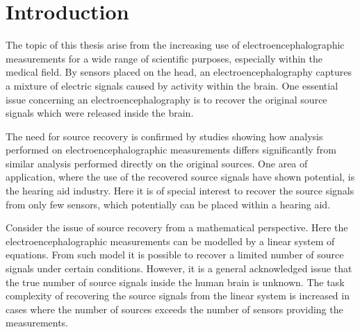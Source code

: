 \chapter*{Introduction}\label{ch:introduction}
%
%
The topic of this thesis arise from the increasing use of electroencephalographic measurements for a wide range of scientific purposes, especially within the medical field. 
By sensors placed on the head, an electroencephalography captures a mixture of electric signals caused by activity within the brain.   
One essential issue concerning an electroencephalography is to  
recover the original source signals which were released inside the brain. 
 
The need for source recovery is confirmed by studies showing how analysis performed on electroencephalographic measurements differs significantly from similar analysis performed directly on the original sources\cite{Friston2002}.
One area of application, where the use of the recovered source signals have shown potential, is the hearing aid industry. Here it is of special interest to recover the source signals from only few sensors, which potentially can be placed within a hearing aid.     

Consider the issue of source recovery from a mathematical perspective. Here the electroencephalographic measurements can be modelled by a linear system of equations. From such model it is possible to recover a limited number of source signals under certain conditions. However, it is a general acknowledged issue that the true number of source signals inside the human brain is unknown.
The task complexity of recovering the source signals from the linear system is increased in cases where the number of sources exceeds the number of sensors providing the measurements.

